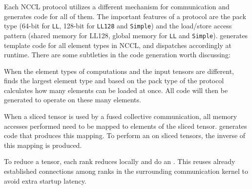 Each NCCL protocol utilizes a different mechanism for communication and
\tool generates code for all of them. The important features of a protocol are
the pack type (64-bit for \texttt{LL}, 128-bit for \texttt{LL128} and \texttt{Simple}) and 
the load/store access pattern (shared memory for LL128, global memory for \texttt{LL} and \texttt{Simple}).
\tool generates template code for all element types in NCCL, and dispatches accordingly at runtime.
There are some subtleties in the code generation worth discussing:

When the element types of computations and the input tensors are different, \tool finds the largest element type and based on 
the pack type of the protocol calculates how many elements can be loaded at once.
All code will then be generated to operate on these many elements.

When a sliced tensor is used by a fused collective communication,
all memory accesses performed need to be mapped to elements of the sliced tensor.
\tool generates code that produces this mapping. 
To perform an \allgather on sliced tensors, the inverse of this mapping is
produced.

To reduce a \sliced tensor, each rank reduces locally and do an \allreduce.
This \allreduce reuses already established connections among ranks in the surrounding communication kernel to avoid extra startup latency.

